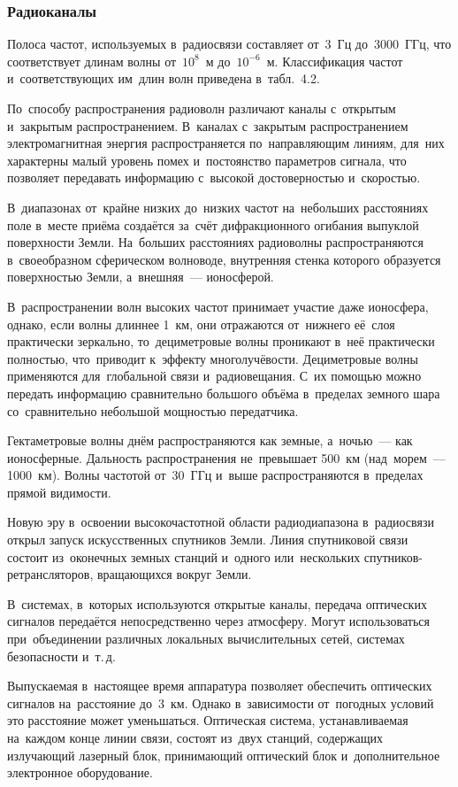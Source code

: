 \documentclass[
	a4paper,
	oneside,
	BCOR = 10mm,
	DIV = 12,
	12pt,
	headings = normal,
]{scrartcl}
\begin{document}
			\subsubsection{Радиоканалы}
				Полоса частот, используемых в~радиосвязи составляет от~3~Гц до~3000~ГГц, что соответствует длинам волны от~$10^{8}$~м до~$10^{-6}$~м. Классификация частот и~соответствующих им~длин волн приведена в~табл.~4.2.

				По~способу распространения радиоволн различают каналы с~открытым и~закрытым распространением. В~каналах с~закрытым распространением электромагнитная энергия распространяется по~направляющим линиям, для~них характерны малый уровень помех и~постоянство параметров сигнала, что позволяет передавать информацию с~высокой достоверностью и~скоростью.

				В~диапазонах от~крайне низких до~низких частот на~небольших расстояниях поле в~месте приёма создаётся за~счёт дифракционного огибания выпуклой поверхности Земли. На~больших расстояниях радиоволны распространяются в~своеобразном сферическом волноводе, внутренняя стенка которого образуется поверхностью Земли, а~внешняя~— ионосферой.
				
				В~распространении волн высоких частот принимает участие даже ионосфера, однако, если волны длиннее 1~км, они отражаются от~нижнего её~слоя практически зеркально, то~дециметровые волны проникают в~неё практически полностью, что~приводит к~эффекту многолучёвости. Дециметровые волны применяются для~глобальной связи и~радиовещания. С~их помощью можно передать информацию сравнительно большого объёма в~пределах земного шара со~сравнительно небольшой мощностью передатчика.

				Гектаметровые волны днём распространяются как земные, а~ночью~— как ионосферные. Дальность распространения не~превышает 500~км (над~морем~— 1000~км). Волны частотой от~30~ГГц и~выше распространяются в~пределах прямой видимости.

				Новую эру в~освоении высокочастотной области радиодиапазона в~радиосвязи открыл запуск искусственных спутников Земли. Линия спутниковой связи состоит из~оконечных земных станций и~одного или~нескольких спутников-ретрансляторов, вращающихся вокруг Земли. 

				В~системах, в~которых используются открытые каналы, передача оптических сигналов передаётся непосредственно через атмосферу. Могут использоваться при~объединении различных локальных вычислительных сетей, системах безопасности и~т.\,д.

				Выпускаемая в~настоящее время аппаратура позволяет обеспечить оптических сигналов на~расстояние до~3~км. Однако в~зависимости от~погодных условий это расстояние может уменьшаться. Оптическая система, устанавливаемая на~каждом конце линии связи, состоят из~двух станций, содержащих излучающий лазерный блок, принимающий оптический блок и~дополнительное электронное оборудование.
\end{document}
